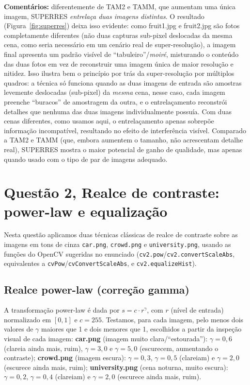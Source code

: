 \documentclass[10pt,twocolumn,letterpaper]{article}
\begin{document}
\textbf{Comentários:} diferentemente de TAM2 e TAMM, que aumentam uma única
imagem, SUPERRES \emph{entrelaça duas imagens distintas}. O resultado
(Figura~\ref{fig:superres}) deixa isso evidente: como fruit1.jpg e
fruit2.jpg são fotos completamente diferentes (não duas capturas
sub-pixel deslocadas da mesma cena, como seria necessário em um cenário real
de super-resolução), a imagem final apresenta um padrão visível de
``tabuleiro''/\emph{moiré}, misturando o conteúdo das duas fotos em vez de
reconstruir uma imagem única de maior resolução e nitidez. Isso ilustra bem
o princípio por trás da super-resolução por múltiplos quadros: a técnica só
funciona quando as duas imagens de entrada são amostras levemente deslocadas
(sub-pixel) da \emph{mesma} cena, nesse caso, cada imagem preenche
``buracos'' de amostragem da outra, e o entrelaçamento reconstrói detalhes
que nenhuma das duas imagens individualmente possuía. Com duas cenas
diferentes, como usamos aqui, o entrelaçamento apenas sobrepõe informação
incompatível, resultando no efeito de interferência visível. Comparado a
TAM2 e TAMM (que, embora aumentem o tamanho, não acrescentam detalhe real),
SUPERRES mostra o maior potencial de ganho de qualidade, mas apenas quando
usado com o tipo de par de imagens adequado.

\section{Questão 2, Realce de contraste: power-law e equalização}

Nesta questão aplicamos duas técnicas clássicas de realce de contraste sobre
as imagens em tons de cinza \texttt{car.png}, \texttt{crowd.png} e
\texttt{university.png}, usando as funções do OpenCV sugeridas no enunciado
(\texttt{cv2.pow}/\texttt{cv2.convertScaleAbs}, equivalentes a
\texttt{cvPow}/\texttt{cvConvertScaleAbs}, e \texttt{cv2.equalizeHist}).

\subsection{Realce power-law (correção gamma)}

A transformação power-law é dada por $s = c \cdot r^{\gamma}$, com $r$ (nível
de entrada) normalizado em $[0,1]$ e $c=255$. Testamos, para cada imagem,
pelo menos dois valores de $\gamma$ maiores que 1 e dois menores que 1,
escolhidos a partir da inspeção visual de cada imagem: \textbf{car.png}
(imagem muito clara/``estourada''): $\gamma=0{,}6$ (clareia ainda mais,
ruim), $\gamma=3{,}0$ e $\gamma=5{,}0$ (escurecem, aumentando o contraste);
\textbf{crowd.png} (imagem escura): $\gamma=0{,}3$, $\gamma=0{,}5$
(clareiam) e $\gamma=2{,}0$ (escurece ainda mais, ruim);
\textbf{university.png} (cena noturna, muito escura): $\gamma=0{,}2$,
$\gamma=0{,}4$ (clareiam) e $\gamma=2{,}0$ (escurece ainda mais, ruim).
\end{document}
